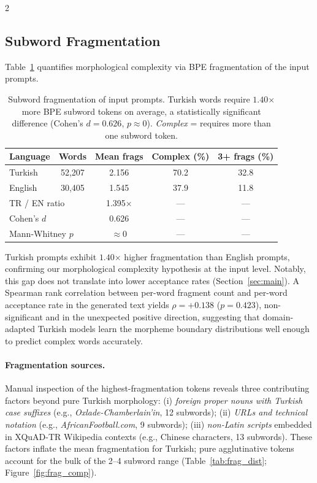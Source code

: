 \documentclass[11pt,a4paper]{article}
\begin{document}
\begin{multicols}{2}
\subsection{Subword Fragmentation}
\label{sec:fragmentation}

Table~\ref{tab:frag} quantifies morphological complexity via BPE
fragmentation of the input prompts.

\begin{table}[t]
\centering
\small
\begin{tabular}{lcccc}
\toprule
\textbf{Language} & \textbf{Words} & \textbf{Mean frags} &
  \textbf{Complex (\%)} & \textbf{3+ frags (\%)} \\
\midrule
Turkish & 52{,}207 & 2.156 & 70.2 & 32.8 \\
English & 30{,}405 & 1.545 & 37.9 & 11.8 \\
\midrule
\multicolumn{2}{l}{TR / EN ratio} & 1.395$\times$ & — & — \\
\multicolumn{2}{l}{Cohen's $d$}   & 0.626 & — & — \\
\multicolumn{2}{l}{Mann-Whitney $p$} & $\approx 0$ & — & — \\
\bottomrule
\end{tabular}
\caption{Subword fragmentation of input prompts.
Turkish words require $1.40$$\times$ more BPE subword tokens on
average, a statistically significant difference (Cohen's $d = 0.626$,
$p \approx 0$).
\textit{Complex} = requires more than one subword token.}
\label{tab:frag}
\end{table}

Turkish prompts exhibit $1.40$$\times$ higher fragmentation than
English prompts, confirming our morphological complexity hypothesis at the
input level.
Notably, this gap does not translate into lower acceptance rates
(Section~\ref{sec:main}).
A Spearman rank correlation between per-word fragment count and per-word
acceptance rate in the generated text yields $\rho = +0.138$
($p = 0.423$), non-significant and in the unexpected positive direction,
suggesting that domain-adapted Turkish models learn the morpheme boundary
distributions well enough to predict complex words accurately.

\paragraph{Fragmentation sources.}
Manual inspection of the highest-fragmentation tokens reveals three
contributing factors beyond pure Turkish morphology:
(i) \textit{foreign proper nouns with Turkish case suffixes}
    (e.g., \textit{Oxlade-Chamberlain'in}, 12 subwords);
(ii) \textit{URLs and technical notation}
    (e.g., \textit{AfricanFootball.com}, 9 subwords);
(iii) \textit{non-Latin scripts} embedded in XQuAD-TR Wikipedia contexts
    (e.g., Chinese characters, 13 subwords).
These factors inflate the mean fragmentation for Turkish; pure agglutinative
tokens account for the bulk of the 2–4 subword range
(Table~\ref{tab:frag_dist}; Figure~\ref{fig:frag_comp}).


\end{multicols}
\end{document}
